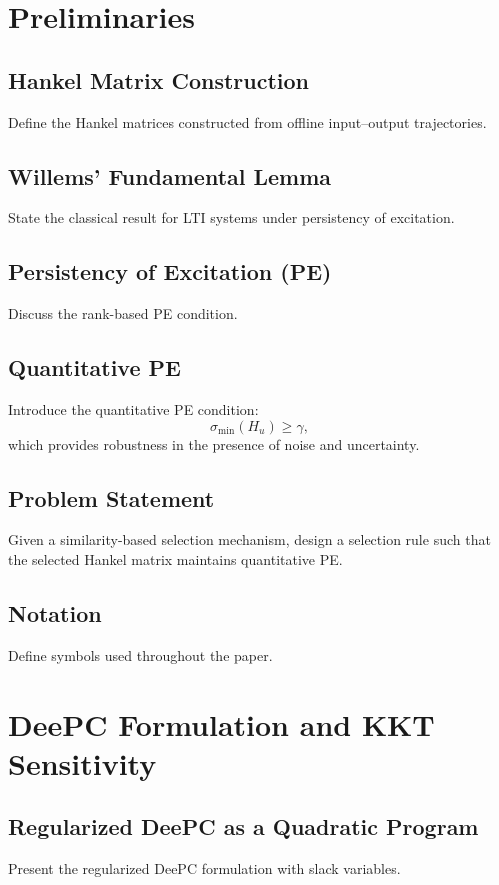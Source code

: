 \documentclass{article}
\theoremstyle{definition}
\begin{document}
\section{Preliminaries}

\subsection{Hankel Matrix Construction}
Define the Hankel matrices constructed from offline input--output trajectories.

\subsection{Willems' Fundamental Lemma}
State the classical result for LTI systems under persistency of excitation.

\subsection{Persistency of Excitation (PE)}
Discuss the rank-based PE condition.

\subsection{Quantitative PE}
Introduce the quantitative PE condition:
\[
\sigma_{\min}(H_u) \ge \gamma,
\]
which provides robustness in the presence of noise and uncertainty.

\subsection{Problem Statement}
Given a similarity-based selection mechanism, design a selection rule such that the selected Hankel matrix maintains quantitative PE.

\subsection{Notation}
Define symbols used throughout the paper.



\section{DeePC Formulation and KKT Sensitivity}

\subsection{Regularized DeePC as a Quadratic Program}
Present the regularized DeePC formulation with slack variables.
\end{document}
